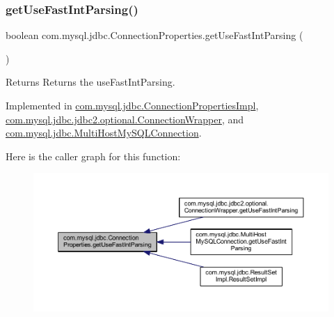 \subsubsection{\texorpdfstring{get\+Use\+Fast\+Int\+Parsing()}{getUseFastIntParsing()}}
{\footnotesize\ttfamily boolean com.\+mysql.\+jdbc.\+Connection\+Properties.\+get\+Use\+Fast\+Int\+Parsing (\begin{DoxyParamCaption}{ }\end{DoxyParamCaption})}

\begin{DoxyReturn}{Returns}
Returns the use\+Fast\+Int\+Parsing. 
\end{DoxyReturn}


Implemented in \mbox{\hyperlink{classcom_1_1mysql_1_1jdbc_1_1_connection_properties_impl_a06e5e6007f2b5099a136142011894c74}{com.\+mysql.\+jdbc.\+Connection\+Properties\+Impl}}, \mbox{\hyperlink{classcom_1_1mysql_1_1jdbc_1_1jdbc2_1_1optional_1_1_connection_wrapper_a4f29d0eb16ff4042f8c91983bc766bdc}{com.\+mysql.\+jdbc.\+jdbc2.\+optional.\+Connection\+Wrapper}}, and \mbox{\hyperlink{classcom_1_1mysql_1_1jdbc_1_1_multi_host_my_s_q_l_connection_ac96f1a2219ce5549d6d205687484734e}{com.\+mysql.\+jdbc.\+Multi\+Host\+My\+S\+Q\+L\+Connection}}.

Here is the caller graph for this function\+:\nopagebreak
\begin{figure}[H]
\begin{center}
\leavevmode
\includegraphics[width=350pt]{interfacecom_1_1mysql_1_1jdbc_1_1_connection_properties_af48fc4f6629e4ada4cf9bc8668207e1c_icgraph}
\end{center}
\end{figure}
\mbox{\label{interfacecom_1_1mysql_1_1jdbc_1_1_connection_properties_a415c18a036cfda4e12ac4c6952a303b1}} 
